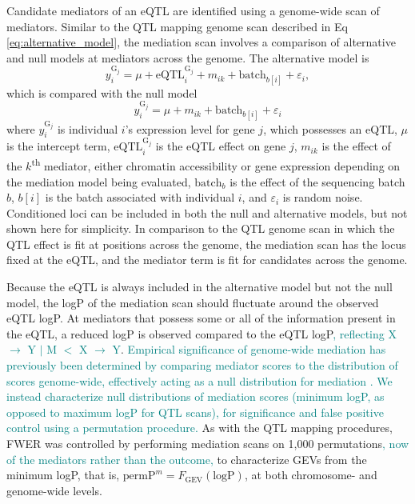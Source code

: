 \documentclass[10pt,letterpaper]{article}
\newcommand{\permpmed}{\text{permP}^{m}}
\newcommand{\GKinline}[1]{\textcolor{teal}{#1}}
\begin{document}
Candidate mediators of an eQTL are identified using a genome-wide scan of mediators. 
Similar to the QTL mapping genome scan described in Eq \ref{eq:alternative_model}, the mediation scan involves a comparison of alternative and null models at mediators across the genome. The alternative model is
\begin{equation}
y^{\text{G}_{j}}_{i} = \mu + \text{eQTL}_{i}^{\text{G}_{j}} + m_{ik} + \text{batch}_{b[i]} + \varepsilon_{i},
\label{eq:mediation_alt}
\end{equation}
which is compared with the null model
\begin{equation}
y^{\text{G}_{j}}_{i} = \mu + m_{ik} \nonumber + \text{batch}_{b[i]} + \varepsilon_{i}
\label{eq:mediation_null}
\end{equation}
where $y^{\text{G}_{j}}_{i}$ is individual $i$'s expression level for gene $j$, which possesses an eQTL, $\mu$ is the intercept term, $\text{eQTL}_{i}^{\text{G}_{j}}$ is the eQTL effect on gene $j$, $m_{ik}$ is the effect of the $k$\textsuperscript{th} mediator, either chromatin accessibility or gene expression depending on the mediation model being evaluated, $\text{batch}_{b}$ is the effect of the sequencing batch $b$, $b[i]$ is the batch associated with individual $i$, and $\varepsilon_{i}$ is random noise. Conditioned loci can be included in both the null and alternative models, but not shown here for simplicity. In comparison to the QTL genome scan in which the QTL effect is fit at positions across the genome, the mediation scan has the locus fixed at the eQTL, and the mediator term is fit for candidates across the genome.

Because the eQTL is always included in the alternative model but not the null model, the logP of the mediation scan should fluctuate around the observed eQTL logP. At mediators that possess some or all of the information present in the eQTL, a reduced logP is observed compared to the eQTL logP\GKinline{, reflecting X $\rightarrow$ Y $|$ M $<$ X $\rightarrow$ Y}. \GKinline{Empirical significance of genome-wide mediation has previously been determined by comparing mediator scores to the distribution of scores genome-wide, effectively acting as a null distribution for mediation \cite{Chick2016,Keller2018,Skelly2019}. We instead characterize null distributions of mediation scores (minimum logP, as opposed to maximum logP for QTL scans), for significance and false positive control using a permutation procedure.} As with the QTL mapping procedures, FWER was controlled by performing mediation scans on 1,000 permutations\GKinline{, now of the mediators rather than the outcome,} to characterize GEVs from the minimum logP, that is, $\permpmed = F_{\text{GEV}}(\text{logP})$, at both chromosome- and genome-wide levels. 
\end{document}
